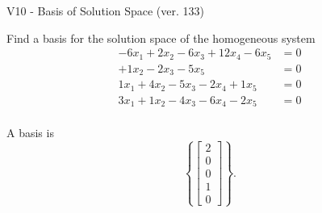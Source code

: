 \begin{exercise}
  \begin{exerciseTitle}V10 - Basis of Solution Space (ver. 133)\end{exerciseTitle}
  \begin{exerciseStatement}
    Find a basis for the solution space of the homogeneous system 
\begin{align*}
 -6 x_ 1 + 2 x_ 2 -6 x_ 3 + 12 x_ 4 -6 x_ 5 &= 0  \\ 
  + 1 x_ 2 -2 x_ 3 -5 x_ 5 &= 0  \\ 
  1 x_ 1 + 4 x_ 2 -5 x_ 3 -2 x_ 4 + 1 x_ 5 &= 0  \\ 
  3 x_ 1 + 1 x_ 2 -4 x_ 3 -6 x_ 4 -2 x_ 5 &= 0  \\ 
 \end{align*}


 
  \end{exerciseStatement}

  \begin{exerciseAnswer}
   A basis is   
\[\left\{\left[\begin{array}{c}
2 \\
0 \\
0 \\
1 \\
0
\end{array}\right]\right\}.\]

  


  \end{exerciseAnswer}
\end{exercise}